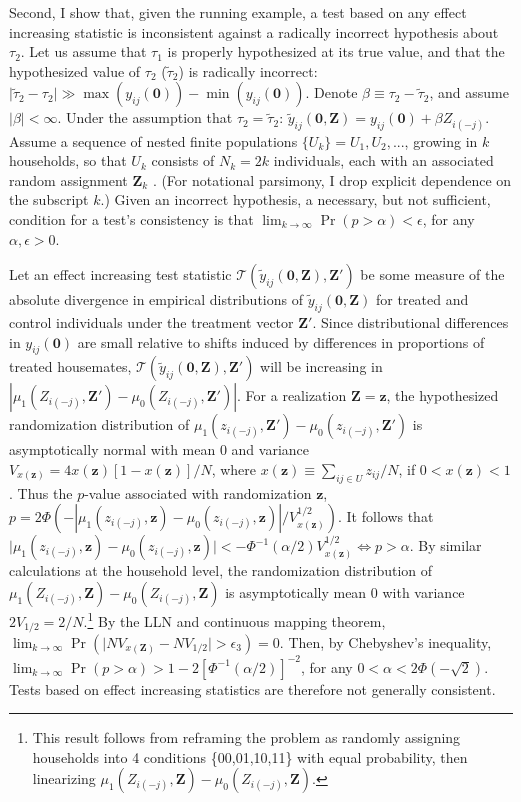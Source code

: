 \documentclass[12pt]{article}
\newcommand{\Z}{\mathbf{Z}}
\newcommand{\T}{\mathcal{T}}
\newcommand{\z}{\mathbf{z}}
\newcommand{\0}{\mathbf{0}}
\newcommand{\plim}{{\rm plim}}
\begin{document}
Second, I show that, given the running example, a test based on any effect increasing statistic is inconsistent against a radically incorrect hypothesis about $\tau_2$. Let us assume that $\tau_1$ is properly hypothesized at its true value, and that the hypothesized value of $\tau_2$ ($\widetilde \tau_2$) is radically incorrect: 
$\vert \widetilde\tau_2 - \tau_2 \vert \gg  \max(y_{ij}(\0)) - \min(y_{ij}(\0))$. Denote $\beta \equiv \tau_2 - \widetilde\tau_2$, and assume $\vert \beta \vert < \infty$.
Under the assumption that $\tau_2 = \widetilde \tau_2$:
$\widetilde y_{ij}(\0,\Z) = y_{ij}(\0) + \beta Z_{i(-j)}$. 
Assume a sequence of nested finite populations $\{U_k\} = U_1, U_2,...$, growing in $k$ households, so that $U_k$ consists of $N_k = 2k$ individuals, each with an associated random assignment $\Z_k$ \citep{isakifuller}. (For notational parsimony, I drop explicit dependence on the subscript $k$.)  Given an incorrect hypothesis, a necessary, but not sufficient, condition for a test's consistency is that $\lim_{k \rightarrow \infty} \Pr(p > \alpha) < \epsilon$, for any $\alpha,\epsilon > 0$. 

Let an effect increasing test statistic $\T(\widetilde y_{ij}(\0,\Z),\Z')$ be some measure of the absolute divergence in empirical distributions of $\widetilde y_{ij}(\0,\Z)$ for treated and control individuals under the treatment vector $\Z'$. 
Since distributional differences in $y_{ij}(\0)$ are small relative to shifts induced by differences in proportions of treated housemates,  $\T(\widetilde y_{ij}(\0,\Z),\Z')$ will be increasing in 
 $ \left\vert \mu_1(Z_{i(-j)},\Z') -   \mu_0(Z_{i(-j)},\Z') \right\vert$. %
For a realization $\Z = \z$, 
the hypothesized randomization distribution of
 $\mu_1(z_{i(-j)},\Z') - \mu_0(z_{i(-j)},\Z')$ is asymptotically normal with mean $0$ and variance $V_{x(\z)} = 4 x(\z) \left[1-x(\z)\right] / N$, where $x(\z) \equiv \sum_{ij\in U}z _{ij} /N$,
if $0 < x(\z) <  1$. %
 Thus the $p$-value associated with randomization $\z$, $p = 2 \Phi(-|\mu_1(z_{i(-j)},\z) - \mu_0(z_{i(-j)},\z)|/V_{x(\z)}^{1/2})$. It follows that  
 $|\mu_1(z_{i(-j)},\z) - \mu_0(z_{i(-j)},\z)\vert < -\Phi^{-1}(\alpha/2) V_{x(\z)}^{1/2} \Leftrightarrow p > \alpha$. 
By similar calculations at the household level, the %
randomization distribution of 
$\mu_1(Z_{i(-j)},\Z) - \mu_0(Z_{i(-j)},\Z)$ is asymptotically mean $0$ with variance $2 V_{1/2} =  2/N$.\footnote{This result follows from reframing the problem as randomly assigning households into 4 conditions \{00,01,10,11\} with equal probability, then linearizing $\mu_1(Z_{i(-j)},\Z) - \mu_0(Z_{i(-j)},\Z)$.} By the LLN %
and continuous mapping theorem, $\lim_{k \rightarrow \infty} \Pr(\vert NV_{x(\Z)} - NV_{1/2}\vert > \epsilon_3) = 0$.
  Then, by Chebyshev's inequality, $\lim_{k \rightarrow \infty}  \Pr(p > \alpha) > 1- 2\left[\Phi^{-1}(\alpha/2)\right]^{-2}$, 
  for any $0 < \alpha < 2\Phi(-\sqrt{2})$.  Tests based on effect increasing statistics are therefore not generally consistent.
\end{document}
